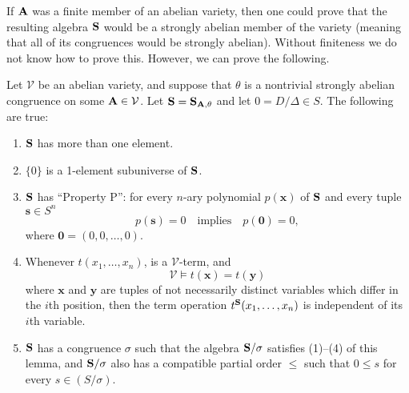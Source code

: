If ${{\mathbf{\uppercase{a}}}}$ was a finite member of an abelian variety,
then one could prove that the resulting algebra
${{\mathbf{\uppercase{s}}}}$ would be a strongly abelian
member of the variety (meaning that
all of its congruences would be strongly
abelian). Without finiteness we do not know how to prove this.
However, we can prove the following.

\begin{lm}\label{nonaffine}
  Let $\mathcal V$ be an abelian variety, and suppose that
  $\theta$ is a nontrivial strongly abelian congruence on some
  ${{\mathbf{\uppercase{a}}}}\in\mathcal V$. Let ${{\mathbf{\uppercase{s}}}} = {{\mathbf{\uppercase{s}}}}_{{{\mathbf{\uppercase{a}}}},\theta}$
  and let $0 = D/\Delta\in S$. The following are true:
  \begin{enumerate}
    \item ${{\mathbf{\uppercase{s}}}}$ has more than one element.
  \item $\{0\}$ is a 1-element subuniverse of ${{\mathbf{\uppercase{s}}}}$.
  \item ${{\mathbf{\uppercase{s}}}}$ has ``Property P'': for every $n$-ary polynomial
    $p({{\mathbf{{x}}}})$ of ${{\mathbf{\uppercase{s}}}}$ and every tuple ${{\mathbf{{s}}}}\in S^n$
    \[
p({{\mathbf{{s}}}})=0\quad\textrm{implies}\quad p({{\mathbf{{0}}}})=0,
\]
where ${{\mathbf{{0}}}} = (0,0,\ldots,0)$.
  \item Whenever $t(x_1,\ldots,x_n)$, 
    is a $\mathcal V$-term, and
    \[
    \mathcal V\models t({{\mathbf{{x}}}})=
    t({{\mathbf{{y}}}})
    \]
    where ${{\mathbf{{x}}}}$ and ${{\mathbf{{y}}}}$ are tuples of not necessarily
    distinct variables which differ in the $i$th position,
    then the term operation $t^{{{\mathbf{\uppercase{s}}}}}(x_1,\ldots,x_n)$ is
    independent of its $i$th variable.
  \item ${{\mathbf{\uppercase{s}}}}$ has a congruence $\sigma$ such that the
    algebra ${{\mathbf{\uppercase{s}}}}/\sigma$ satisfies (1)--(4) of this lemma,
    and ${{\mathbf{\uppercase{s}}}}/\sigma$ also
    has a compatible partial order $\leq$ such that
$0\leq s$ for every $s\in (S/\sigma)$.
    \end{enumerate}
  \end{lm}

